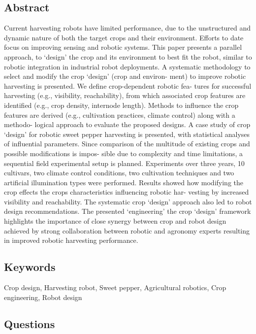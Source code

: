 \documentclass{article}
\begin{document}
\subsection*{Abstract}
Current harvesting robots have limited performance, due to the unstructured and dynamic
nature of both the target crops and their environment. Efforts to date focus on improving
sensing and robotic systems. This paper presents a parallel approach, to ‘design’ the crop
and its environment to best fit the robot, similar to robotic integration in industrial robot
deployments.
A systematic methodology to select and modify the crop ‘design’ (crop and environ-
ment) to improve robotic harvesting is presented. We define crop-dependent robotic fea-
tures for successful harvesting (e.g., visibility, reachability), from which associated crop
features are identified (e.g., crop density, internode length). Methods to influence the crop
features are derived (e.g., cultivation practices, climate control) along with a methodo-
logical approach to evaluate the proposed designs. A case study of crop ‘design’ for robotic
sweet pepper harvesting is presented, with statistical analyses of influential parameters.
Since comparison of the multitude of existing crops and possible modifications is impos-
sible due to complexity and time limitations, a sequential field experimental setup is
planned. Experiments over three years, 10 cultivars, two climate control conditions, two
cultivation techniques and two artificial illumination types were performed. Results
showed how modifying the crop effects the crops characteristics influencing robotic har-
vesting by increased visibility and reachability. The systematic crop ‘design’ approach also
led to robot design recommendations. The presented ‘engineering’ the crop ‘design’
framework highlights the importance of close synergy between crop and robot design
achieved by strong collaboration between robotic and agronomy experts resulting in
improved robotic harvesting performance.


\subsection*{Keywords}
Crop design, Harvesting robot, Sweet pepper, Agricultural robotics, Crop engineering, Robot design


\subsection*{Questions}
\end{document}
